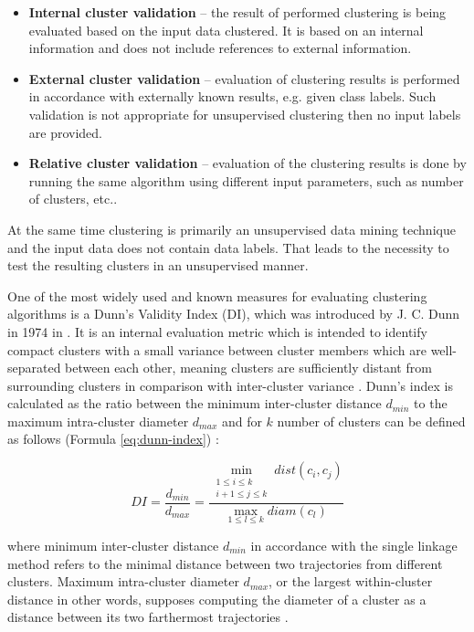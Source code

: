 \begin{itemize}
	\setlength\itemsep{0em}
	\item \textbf{Internal cluster validation} -- the result of performed clustering is being evaluated based on the input data clustered. It is based on an internal information and does not include references to external information.
	\item \textbf{External cluster validation} -- evaluation of clustering results is performed in accordance with externally known results, e.g. given class labels. Such validation is not appropriate for unsupervised clustering then no input labels are provided.
	\item \textbf{Relative cluster validation} -- evaluation of the clustering results is done by running the same algorithm using different input parameters, such as number of clusters, etc..
\end{itemize}

At the same time clustering is primarily an unsupervised data mining technique and the input data does not contain data labels. That leads to the necessity to test the resulting clusters in an unsupervised manner. 

One of the most widely used and known measures for evaluating clustering algorithms is a Dunn's Validity Index (DI), which was introduced by J. C. Dunn in 1974 in \cite{article:dunn_orig}. It is an internal evaluation metric which is intended to identify compact clusters with a small variance between cluster members which are well-separated between each other, meaning clusters are sufficiently distant from surrounding clusters in comparison with inter-cluster variance \cite{online:hier_clust_r}. Dunn's index is calculated as the ratio between the minimum inter-cluster distance $d_{min}$ to the maximum intra-cluster diameter $d_{max}$ and for $k$ number of clusters can be defined as follows (Formula \ref{eq:dunn-index}) \cite{article:quant_eval_perf_clust}:

\begin{equation} \label{eq:dunn-index}
DI = \frac {d_{min}} {d_{max}} = \frac{\min\limits_{\substack{1 \leq i \leq k \\ i+1 \leq j \leq k}} dist(c_i, c_j)} {\max\limits_{1 \leq l \leq k} diam(c_l)}
\end{equation}

where minimum inter-cluster distance $d_{min}$ in accordance with the single linkage method refers to the minimal distance between two trajectories from different clusters. Maximum intra-cluster diameter $d_{max}$, or the largest within-cluster distance in other words, supposes computing the diameter of a cluster as a distance between its two farthermost trajectories \cite{inproceedings:clust_ind}. 

